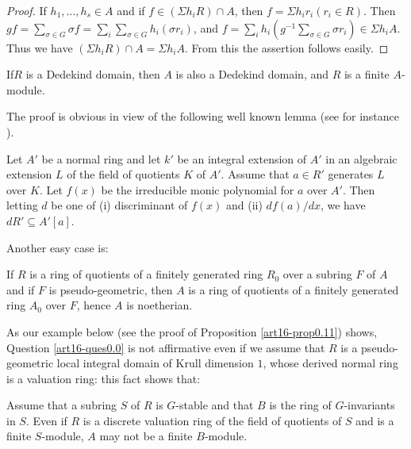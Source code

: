 \begin{proof}
If $h_{1},\ldots,h_{s}\in A$ and if $f\in (\Sigma h_{i}R)\cap A$, then $f=\Sigma h_{i}r_{i}(r_{i}\in R)$. Then $gf=\sum\limits_{\sigma\in G}\sigma f=\sum\limits_{i}\sum\limits_{\sigma\in G}h_{i}(\sigma r_{i})$, and $f=\sum\limits_{i}h_{i}(g^{-1}\sum\limits_{\sigma\in G}\sigma r_{i})\in \Sigma h_{i}A$. Thus we have $(\Sigma h_{i}R)\cap A=\Sigma h_{i}A$. From this the assertion follows easily.
\end{proof}

\begin{proposition}\label{art16-prop0.3}
If\pageoriginale $R$ is a Dedekind domain, then $A$ is also a Dedekind domain, and $R$ is a finite $A$-module.
\end{proposition}

The proof is obvious in view of the following well known lemma (see for instance \cite{art16-key-L}).

\begin{lemma}\label{art16-lem0.4}
Let $A'$ be a normal ring and let $k'$ be an integral extension of $A'$ in an algebraic extension $L$ of the field of quotients $K$ of $A'$. Assume that $a\in R'$ generates $L$ over $K$. Let $f(x)$ be the irreducible monic polynomial for $a$ over $A'$. Then letting $d$ be one of {\rm(i)} discriminant of $f(x)$ and {\rm(ii)} $df(a)/dx$, we have $dR'\subseteq A'[a]$.
\end{lemma}

Another easy case is:

\begin{remark}\label{art16-rem0.5}
If $R$ is a ring of quotients of a finitely generated ring $R_{0}$ over a subring $F$ of $A$ and if $F$ is pseudo-geometric, then $A$ is a ring of quotients of a finitely generated ring $A_{0}$ over $F$, hence $A$ is noetherian.
\end{remark}

As our example below (see the proof of Proposition \ref{art16-prop0.11}) shows, Question \ref{art16-ques0.0} is not affirmative even if we assume that $R$ is a pseudo-geometric local integral domain of Krull dimension $1$, whose derived normal ring is a valuation ring: this fact shows that:

\begin{remark}\label{art16-rem0.6}
Assume that a subring $S$ of $R$ is $G$-stable and that $B$ is the ring of $G$-invariants in $S$. Even if $R$ is a discrete valuation ring of the field of quotients of $S$ and is a finite $S$-module, $A$ may not be a finite $B$-module.
\end{remark}

